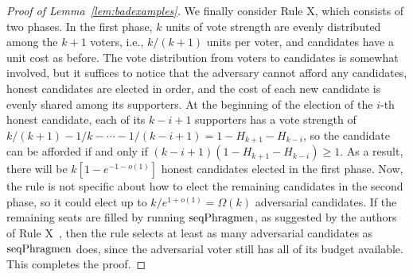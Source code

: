 \begin{proof}[Proof of Lemma~\ref{lem:badexamples}]
We finally consider Rule X, which consists of two phases. 
In the first phase, $k$ units of vote strength are evenly distributed among the $k+1$ voters, i.e., $k/(k+1)$ units per voter, and candidates have a unit cost as before. 
The vote distribution from voters to candidates is somewhat involved, but it suffices to notice that the adversary cannot afford any candidates, honest candidates are elected in order, and the cost of each new candidate is evenly shared among its supporters. 
At the beginning of the election of the $i$-th honest candidate, each of its $k-i+1$ supporters has a vote strength of $k/(k+1) - 1/k - \cdots - 1/(k-i+1)=1-H_{k+1}-H_{k-i}$, so the candidate can be afforded if and only if $(k-i+1)(1-H_{k+1} - H_{k-i})\geq 1$. As a result, there will be $k[1- e^{-1-o(1)}]$ honest candidates elected in the first phase. 
Now, the rule is not specific about how to elect the remaining candidates in the second phase, so it could elect up to $k/e^{1+o(1)}=\Omega(k)$ adversarial candidates. 
If the remaining seats are filled by running $\operatorname{seqPhragmen}$, as suggested by the authors of Rule X~\cite{peters2019proportionality}, then the rule selects at least as many adversarial candidates as $\operatorname{seqPhragmen}$ does, since the adversarial voter still has all of its budget available. This completes the proof.
\end{proof}

